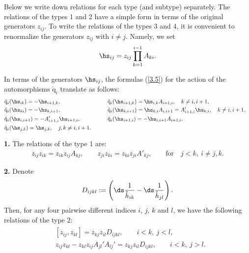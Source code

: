 \documentclass[pdftex]{sigma}
\def\nplus{\mathfrak{n}}\def\nn{\nonumber}\def\nin{\noindent}
\def\q{\check{\mathrm q}}\def\Q{\mathrm{Q}}\def\r#1{(\ref{#1})}\let\rf=\r
\def\s{z}\def\S{\mathrm {S}}\def\si{\sigma}\def\Sp{\S^{\nplus}}\def\sy{\acute{\sigma}}\def\th{\mathring{h}}
\def\tphi{A}\def\tpsi{A'}\def\tphiplus{B}\def\tpsiminus{B'}\def\ttphi{B}\def\ttpsi{B'}\def\ts{\hskip1pt}\def\tts{\hskip.5pt}
\numberwithin{equation}{section}
\begin{document}
Below we write down relations for each type (and subtype) separately. The relations of the types 1 and 2 have a simple form in terms of the original
generators $\s_{ij}$. To write the relations  of the types 3 and 4, it is convenient to renormalize the generators $\s_{ij}$
with $i\not=j$. Namely, we set
\begin{gather}
\label{not8}\hs_{ij}=\s_{ij}\prod_{k=1}^{i-1}\tphi_{ki}  .
\end{gather}

In terms of the generators $\hs_{ij}$, the formulas \rf{3.5} for the action of the automorphisms $\q_i$  translate as follows:
\begin{alignat*}{3}
& \q_{i}(\hs_{ik})=-\hs_{i+1,k} ,\qquad &&  \q_{i}(\hs_{i+1,k})=\hs_{i,k}\tphi_{i+1,i} ,\quad k\not=i,i+1 , & \\
&\q_{i}(\hs_{ki})=-\hs_{k,i+1} ,\qquad && \q_{i}(\hs_{k,i+1})=\hs_{k,i}\tphi_{i,i+1}=\tpsi_{i+1,i}\hs_{k,i} ,\quad k\not=i,i+1,&
\\
&\q_{i}(\hs_{i,i+1})=-\tpsi_{i+1,i}\hs_{i+1,i} , \qquad &&\q_{i}(\hs_{i+1,i})=-\hs_{i,i+1}\tphi_{i+1,i} ,& \\
 &\q_{i}(\hs_{j,k})=\hs_{j,k} , \quad j,k\neq i,i+1 .\qquad &&&
 \end{alignat*}

{\bf 1.} The relations of  the type 1 are:
\begin{gather}\label{relation1}
\s_{ij}\s_{ik}=\s_{ik}\s_{ij}\tphi_{kj} ,\qquad
\s_{ji}\s_{ki}=\s_{ki}\s_{ji}\tpsi_{kj} ,\qquad \text{for}\quad j<k ,\  i\not=j,k .
\end{gather}

{\bf 2.} Denote
\begin{gather*}
D_{ijkl}:=\left( {\ds\frac{1}{\th_{ik}}}-{\ds\frac{1}{\th_{jl}}}\right).
\end{gather*}
Then, for any four pairwise dif\/ferent indices $i$, $j$, $k$ and $l$, we have the following relations of the type 2:
\begin{gather}
\begin{split}
& [ \s_{ij},\s_{kl} ]=\s_{kj}\s_{il}D_{ijkl} , \qquad i<k ,\ j<l  , \\ %
& \s_{ij}\s_{kl}-\s_{kl}\s_{ij}\tphi_{jl}'\tphi_{lj}'=\s_{kj}\s_{il}
D_{ijkl} ,\qquad i<k ,\ j>l.
\end{split} \label{relation2}
\end{gather}
\end{document}
